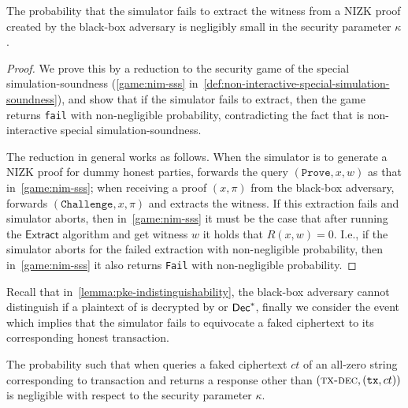 \begin{lemma}
	\label{lemma:good-nizk}
	The probability that the simulator fails to extract the witness from a NIZK proof created by the black-box adversary is negligibly small in the security parameter $\kappa$.
\end{lemma}

\begin{proof}
	We prove this by a reduction to the security game of the special simulation-soundness (\cref{game:nim-sss} in~\cref{def:non-interactive-special-simulation-soundness}), and show that if the simulator fails to extract, then the game returns \texttt{fail} with non-negligible probability, contradicting the fact that \NIZK is non-interactive special simulation-soundness.

	The reduction in general works as follows.
	When the simulator \simulator is to generate a NIZK proof for dummy honest parties, \simulator forwards the query $(\mathtt{Prove}, x, w)$ as that in~\cref{game:nim-sss}; when receiving a proof $(x, \pi)$ from the black-box adversary, \simulator forwards $(\mathtt{Challenge}, x, \pi)$ and extracts the witness.
	If this extraction fails and simulator aborts, then in~\cref{game:nim-sss} it must be the case that after running the $\mathsf{Extract}$ algorithm and get witness $w$ it holds that $R(x, w) = 0$.
	I.e., if the simulator aborts for the failed extraction with non-negligible probability, then in~\cref{game:nim-sss} it also returns \texttt{Fail} with non-negligible probability.
\end{proof}

Recall that in~\cref{lemma:pke-indistinguishability}, the black-box adversary \adv cannot distinguish if a plaintext of \PKE is decrypted by \Dec or $\mathsf{Dec}^*$, finally we consider the event \badDec which implies that the simulator fails to equivocate a faked ciphertext to its corresponding honest transaction.

\begin{lemma}
	\label{lemma:good-decryption}
	The probability such that when \adv queries \funcEnclave a faked ciphertext $ct$ of an all-zero string corresponding to transaction \tx and \funcEnclave returns a response other than $(\textsc{tx-dec}, (\mathtt{tx}, ct))$ is negligible with respect to the security parameter $\kappa$.
\end{lemma}

